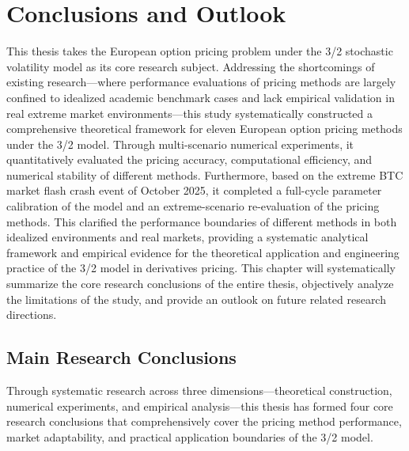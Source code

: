\chapter{Conclusions and Outlook}
\label{chap:conclusion}

This thesis takes the European option pricing problem under the 3/2 stochastic volatility model as its core research subject. Addressing the shortcomings of existing research—where performance evaluations of pricing methods are largely confined to idealized academic benchmark cases and lack empirical validation in real extreme market environments—this study systematically constructed a comprehensive theoretical framework for eleven European option pricing methods under the 3/2 model. Through multi-scenario numerical experiments, it quantitatively evaluated the pricing accuracy, computational efficiency, and numerical stability of different methods. Furthermore, based on the extreme BTC market flash crash event of October 2025, it completed a full-cycle parameter calibration of the model and an extreme-scenario re-evaluation of the pricing methods. This clarified the performance boundaries of different methods in both idealized environments and real markets, providing a systematic analytical framework and empirical evidence for the theoretical application and engineering practice of the 3/2 model in derivatives pricing. This chapter will systematically summarize the core research conclusions of the entire thesis, objectively analyze the limitations of the study, and provide an outlook on future related research directions.

\section{Main Research Conclusions}

Through systematic research across three dimensions—theoretical construction, numerical experiments, and empirical analysis—this thesis has formed four core research conclusions that comprehensively cover the pricing method performance, market adaptability, and practical application boundaries of the 3/2 model.

